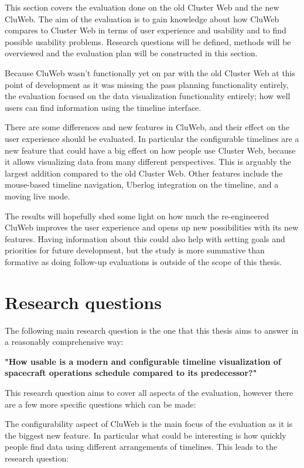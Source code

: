
This section covers the evaluation done on the old Cluster Web and the new CluWeb. The aim of the evaluation is to gain knowledge about how CluWeb compares to Cluster Web in terms of user experience and usability and to find possible usability problems. Research questions will be defined, methods will be overviewed and the evaluation plan will be constructed in this section.

Because CluWeb wasn't functionally yet on par with the old Cluster Web at this point of development as it was missing the pass planning functionality entirely, the evaluation focused on the data visualization functionality entirely; how well users can find information using the timeline interface.

There are some differences and new features in CluWeb, and their effect on the user experience should be evaluated. In particular the configurable timelines are a new feature that could have a big effect on how people use Cluster Web, because it allows visualizing data from many different perspectives. This is arguably the largest addition compared to the old Cluster Web. Other features include the mouse-based timeline navigation, Uberlog integration on the timeline, and a moving live mode.

The results will hopefully shed some light on how much the re-engineered CluWeb improves the user experience and opens up new possibilities with its new features. Having information about this could also help with setting goals and priorities for future development, but the study is more summative than formative as doing follow-up evaluations is outside of the scope of this thesis. \cite{albert2013measuring}

\section{Research questions} \label{research_questions}
The following main research question is the one that this thesis aims to answer in a reasonably comprehensive way:

\textbf{"How usable is a modern and configurable timeline visualization of spacecraft operations schedule compared to its predecessor?"}

This research question aims to cover all aspects of the evaluation, however there are a few more specific questions which can be made:

The configurability aspect of CluWeb is the main focus of the evaluation as it is the biggest new feature. In particular what could be interesting is how quickly people find data using different arrangements of timelines. This leads to the research question:

